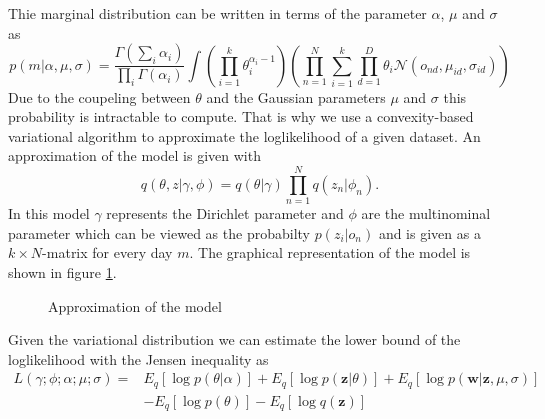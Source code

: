 \documentclass[11pt,a4paper]{article}
\begin{document}
  Thie marginal distribution can be written in terms of the parameter $\alpha$, $\mu$ and $\sigma$ as
  \begin{equation}
   p(m|\alpha,\mu,\sigma) = \frac{\Gamma (\sum_i \alpha_i)}{\prod_i \Gamma(\alpha_i)} \int \left( \prod_{i=1}^k \theta_i^{\alpha_i-1} \right)
   \left( \prod_{n=1}^N \sum_{i=1}^k \prod_{d=1}^D \theta_i \mathcal{N}(o_{nd},\mu_{id},\sigma_{id} ) \right)
  \end{equation}
  Due to the coupeling between $\theta$ and the Gaussian parameters $\mu$ and $\sigma$ this probability is intractable to compute. That is why we use a convexity-based variational algorithm to approximate the loglikelihood of a given dataset. 
  An approximation of the model is given with 
  \begin{equation}
   q(\theta,z|\gamma,\phi) = q(\theta|\gamma) \prod_{n=1}^N q(z_n|\phi_n).
  \end{equation}
  In this model $\gamma$ represents the Dirichlet parameter and $\phi$ are the multinominal parameter which can be viewed as the probabilty $p(z_i|o_n)$ and is given as a $k \times N$-matrix for every day $m$. The graphical representation of the model is shown in figure \ref{fig:ModelApprox}.
  
  
\begin{figure}[t!]
\centering
\def\svgwidth{0.4\textwidth}

\caption{Approximation of the model}
\label{fig:ModelApprox}
\end{figure}
  
  
  
  
  Given the variational distribution we can estimate the lower bound of the loglikelihood with the Jensen inequality as
  \begin{equation}
   \begin{split}
    L(\gamma;\phi;\alpha;\mu;\sigma) =& E_q[\log p(\theta|\alpha)] + E_q[\log p(\textbf{z}|\theta)] + E_q[\log p(\textbf{w}|\textbf{z},\mu,\sigma)] \\
   & -E_q[\log p(\theta)] - E_q[\log q(\textbf{z})]
   \end{split}
  \end{equation}
\end{document}
